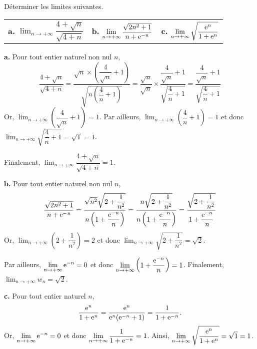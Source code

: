 \documentclass[11pt,fleqn]{book} %
\begin{document}
\begin{exercise}Déterminer les limites suivantes.

\begin{tabularx}{\linewidth}{XXX}
\textbf{a.} $\displaystyle\lim_{n\to +\infty}\dfrac{4+\sqrt{n}}{\sqrt{4+n}}$ & \textbf{b.} $\displaystyle\lim_{n\to +\infty}\dfrac{\sqrt{2n^2+1}}{n+\mathrm{e}^{-n}}$ & \textbf{c.} $\displaystyle\lim_{n\to +\infty}\sqrt{\dfrac{\mathrm{e}^n}{1+\mathrm{e}^n}}$
\end{tabularx}
\vskip10pt\end{exercise}

\begin{solution}

\textbf{a.} Pour tout entier naturel non nul $n$, 
\[ \dfrac{4+\sqrt{n}}{\sqrt{4+n}} = \dfrac{\sqrt{n} \times \left(\dfrac{4}{\sqrt{n}}+1\right)}{\sqrt{n\left(\dfrac{4}{n}+1\right)}} = \dfrac{\sqrt{n}}{\sqrt{n}} \times \dfrac{\dfrac{4}{\sqrt{n}}+1}{\sqrt{\dfrac{4}{n}+1}} = \dfrac{\dfrac{4}{\sqrt{n}}+1}{\sqrt{\dfrac{4}{n}+1}}\]
Or, $\displaystyle\lim_{n \to + \infty}\left(\dfrac{4}{\sqrt{n}}+1\right)=1$. Par ailleurs, $\displaystyle\lim_{n \to + \infty}\left(\dfrac{4}{n}+1\right)=1$ et donc $\displaystyle\lim_{n \to + \infty}\sqrt{\dfrac{4}{n}+1}=\sqrt{1}=1$. 

Finalement,  $\displaystyle\lim_{n \to + \infty} \dfrac{4+\sqrt{n}}{\sqrt{4+n}}=1$.


\textbf{b.} Pour tout entier naturel non nul $n$,
\[\dfrac{\sqrt{2n^2+1}}{n+\mathrm{e}^{-n}}=\dfrac{\sqrt{n^2}\sqrt{2+\dfrac{1}{n^2}}}{n\left(1+\dfrac{\mathrm{e}^{-n}}{n}\right)}=\dfrac{n\sqrt{2+\dfrac{1}{n^2}}}{n\left(1+\dfrac{\mathrm{e}^{-n}}{n}\right)}=\dfrac{\sqrt{2+\dfrac{1}{n^2}}}{1+\dfrac{\mathrm{e}^{-n}}{n}}\]
Or, $\displaystyle\lim_{n\to +\infty}\left(2+\dfrac{1}{n^2}\right)=2$ et donc $\displaystyle\lim_{n\to +\infty}\sqrt{2+\dfrac{1}{n^2}}=\sqrt{2}$. 

Par ailleurs,  $\displaystyle\lim_{n\to +\infty}\mathrm{e}^{-n}=0$ et donc $\displaystyle\lim_{n\to +\infty}\left(1+\dfrac{\mathrm{e}^{-n}}{n}\right)=1$. Finalement, $\displaystyle\lim_{n\to +\infty}w_n=\sqrt{2}$.


\textbf{c.} Pour tout entier naturel $n$, 
\[\dfrac{\mathrm{e}^n}{1+\mathrm{e}^n}=\dfrac{\mathrm{e}^n}{\mathrm{e}^n(\mathrm{e}^{-n}+1)}=\dfrac{1}{1+\mathrm{e}^{-n}}.\]
Or, $\displaystyle\lim_{n \to + \infty}\mathrm{e}^{-n}=0$ et donc $\displaystyle\lim_{n \to + \infty}\dfrac{1}{1+\mathrm{e}^{-n}}=1$. Ainsi, $\displaystyle\lim_{n \to + \infty}\sqrt{\dfrac{\mathrm{e}^n}{1+\mathrm{e}^n}}=\sqrt{1}=1$.\end{solution}
\end{document}
